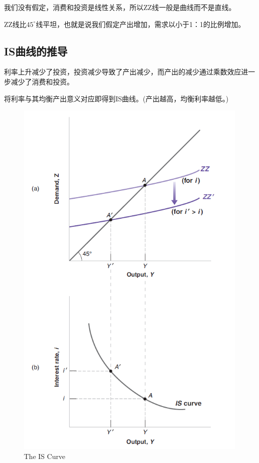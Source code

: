 \documentclass{article}
\begin{document}
我们没有假定，消费和投资是线性关系，所以ZZ线一般是曲线而不是直线。

ZZ线比$ 45^{\circ} $线平坦，也就是说我们假定产出增加，需求以小于1：1的比例增加。

\subsection{IS曲线的推导}
利率上升减少了投资，投资减少导致了产出减少，而产出的减少通过乘数效应进一步减少了消费和投资。

将利率与其均衡产出意义对应即得到IS曲线。(产出越高，均衡利率越低。)

\begin{figure}[H] %
	\centering %
	\includegraphics[width=1\textwidth]{5_2} %
	\caption{The IS Curve} %
	\label{Fig.main3} %
\end{figure}
\end{document}
